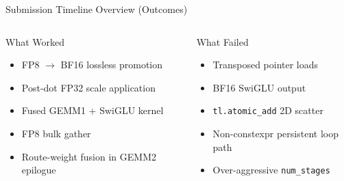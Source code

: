 \documentclass[aspectratio=169,11pt]{beamer}
\begin{document}
\begin{frame}[t]{Submission Timeline Overview (Outcomes)}
\small
\begin{columns}[T]
\begin{exampleblock}{What Worked}
\begin{itemize}
    \item FP8 $\to$ BF16 lossless promotion
    \item Post-dot FP32 scale application
    \item Fused GEMM1 + SwiGLU kernel
    \item FP8 bulk gather
    \item Route-weight fusion in GEMM2 epilogue
\end{itemize}
\end{exampleblock}
\begin{alertblock}{What Failed}
\begin{itemize}
    \item Transposed pointer loads
    \item BF16 SwiGLU output
    \item \texttt{tl.atomic\_add} 2D scatter
    \item Non-constexpr persistent loop path
    \item Over-aggressive \texttt{num\_stages}
\end{itemize}
\end{alertblock}
\end{columns}
\end{frame}
\end{document}
